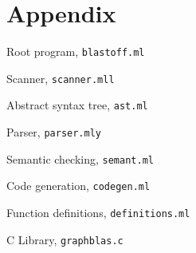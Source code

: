 \section{Appendix}

Root program, \verb=blastoff.ml=

Scanner, \verb=scanner.mll=

Abstract syntax tree, \verb=ast.ml=

Parser, \verb=parser.mly=

Semantic checking, \verb=semant.ml=

Code generation, \verb=codegen.ml=

Function definitions, \verb=definitions.ml=

C Library, \verb=graphblas.c=

